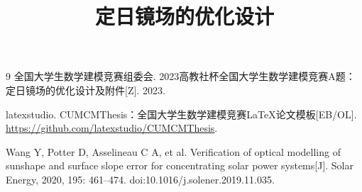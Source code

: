 \documentclass[bwprint]{cumcmthesis}
\title{定日镜场的优化设计}
\begin{document}












\clearpage
\begin{thebibliography}{9}
全国大学生数学建模竞赛组委会.
2023高教社杯全国大学生数学建模竞赛A题：定日镜场的优化设计及附件[Z].
2023.

latexstudio.
CUMCMThesis：全国大学生数学建模竞赛\LaTeX{}论文模板[EB/OL].
\url{https://github.com/latexstudio/CUMCMThesis}.

Wang Y, Potter D, Asselineau C A, et al.
Verification of optical modelling of sunshape and surface slope error for concentrating solar power systems[J].
Solar Energy, 2020, 195: 461--474.
doi:10.1016/j.solener.2019.11.035.
\end{thebibliography}


\end{document}
